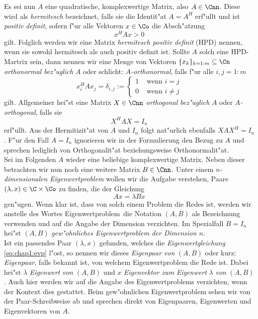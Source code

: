Es sei nun $A$ eine quadratische, komplexwertige Matrix, also $A\in\Cnn$. Diese wird als \emph{hermitesch} bezeichnet, falls sie die Identit"at $A=A^H$ erf"ullt und ist \emph{positiv definit}, sofern
f"ur alle Vektoren $x\in\Co$ die Absch"atzung
\[
x^H A x > 0
\]
gilt. Folglich werden wir eine Matrix \emph{hermitesch positiv definit} (HPD)
nennen, wenn sie sowohl hermitesch als auch positiv definit ist. Sollte $A$ solch eine HPD-Martrix sein,
dann nennen wir eine Menge von Vektoren $\{x_k\}_{k=1:m}\subseteq\Cn$ \emph{orthonormal
bez"uglich} $A$ oder schlicht: \emph{$A$-orthonormal}, falls
f"ur alle $i,j = 1:m$
\[
x_i^H A x_j = \delta_{i,j} := \begin{cases}
1 & \text{ wenn } i=j \\
0 & \text{ wenn } i\neq j
\end{cases}
\]
gilt. Allgemeiner hei"st eine Matrix $X\in\Cnn$ \emph{orthogonal bez"uglich} $A$ oder \emph{$A$-orthogonal}, falls sie
\[
X^H A X = I_n
\]
erf"ullt. Aus der Hermitizit"at von $A$ und $I_n$ folgt nat"urlich ebenfalls $XAX^H = I_n$. F"ur den Fall $A=I_n$ ignorieren wir in der Formulierung den Bezug zu $A$ und sprechen lediglich von Orthogonalit"at beziehungsweise Orthonormalit"at.\\

Sei im Folgenden $A$ wieder eine beliebige komplexwertige Matrix. Neben dieser betrachten wir nun noch eine weitere Matrix $B\in\Cnn$.
Unter einem \emph{$n$-dimensionalen Eigenwertproblem} wollen wir die Aufgabe verstehen, Paare $(\lambda,x)\in\C\times\Co$ zu finden, die der Gleichung
\begin{equation}\label{eq:chap1:evp}
Ax = \lambda Bx
\end{equation}
gen"ugen. Wenn klar ist, dass von solch einem Problem die Redes ist, werden wir anstelle des Wortes \glqq Eigenwertproblem\grqq\ die Notation $(A,B)$ als Bezeichnung verwenden und auf die Angabe der Dimension verzichten. Im Spezialfall $B=I_n$
hei"st $(A,B)$ \emph{gew"ohnliches Eigenwertproblem der Dimension $n$}.\\

Ist ein passendes Paar $(\lambda,x)$ gefunden, welches die \emph{Eigenwertgleichung} \eqref{eq:chap1:evp} l"ost, so nennen wir dieses \emph{Eigenpaar von} $(A,B)$ oder kurz: \emph{Eigenpaar}, falls bekannt ist, von welchem Eigenwertproblem die Rede ist.
Dabei hei"st $\lambda$ \emph{Eigenwert von} $(A,B)$ und $x$ \emph{Eigenvektor zum Eigenwert} $\lambda$ \emph{von} $(A,B)$. Auch hier werden wir auf die Angabe des Eigenwertproblems verzichten, wenn der Kontext dies gestattet.
Beim gew"ohnlichen Eigenwertproblem sehen wir von der Paar-Schreibweise ab und sprechen direkt von Eigenpaaren, Eigenwerten und Eigenvektoren von $A$.\\

